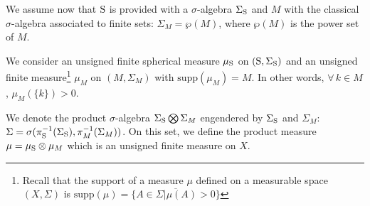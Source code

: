We assume now that $\text{S}$ is provided with a $\sigma$-algebra $\Sigma_{\text{S}}$ and $M$ with the classical $\sigma$-algebra associated to finite sets: $\Sigma_M = \wp(M)$, where $\wp(M)$ is the power set of $M$.

We consider an unsigned finite spherical measure $\mu_{\text{S}}$ on $(\text{S}, \Sigma_{\text{S}})$ and an unsigned finite measure\footnote{Recall that the support of a measure $\mu$ defined on a measurable space $(X, \Sigma)$ is $\text{supp}(\mu) = \overline{\{A \in \Sigma | \mu(A) > 0 \}}$} $\mu_M$ on $(M, \Sigma_M)$ with $\text{supp} (\mu_M) = M$. In other words, $\forall\,k \in M$, $\mu_M(\{k\})  > 0$.


We denote the product $\sigma$-algebra $\Sigma_{\text{S}} \bigotimes \Sigma_M$ engendered by $\Sigma_{\text{S}}$ and $\Sigma_M$: $\Sigma = \sigma( \pi_{\text{S}}^{-1}(\Sigma_{\text{S}}),  \pi_{M}^{-1}(\Sigma_M))$. On this set, we define the product measure $\mu = \mu_{\text{S}} \otimes \mu_M$ which is an unsigned finite measure on $X$.



